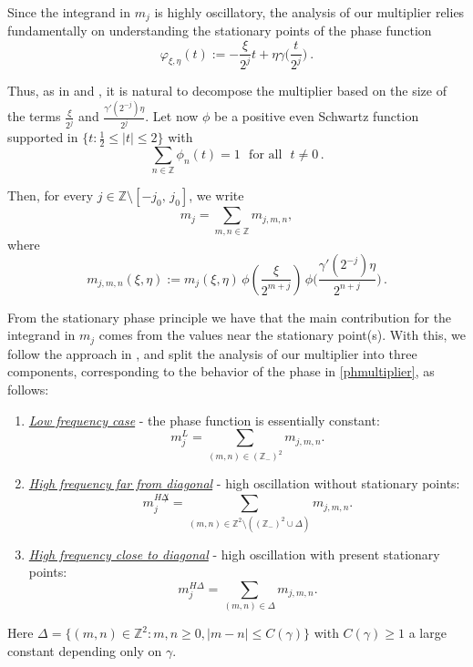 \documentclass{amsart}
\newcommand{\Z}{\mathbb{Z}}
\theoremstyle{definition}
\theoremstyle{remark}
\numberwithin{equation}{section}
\begin{document}
Since the integrand in $m_{j}$ is highly oscillatory, the analysis of our multiplier relies fundamentally
on understanding the stationary points of the phase function
\begin{equation}\label{phmultiplier}
 \varphi_{\xi,\eta}(t):=-\frac{\xi}{2^{j}}t+\eta\gamma\big(\frac{t}{2^{j}}\big)\:.
\end{equation}

Thus, as in \cite{lie2015boundedness} and \cite{lie2019unifiedap}, it is natural to decompose the multiplier based on the size of the terms $\frac{\xi}{2^{j}}$ and $\frac{\gamma'(2^{-j})\eta}{2^{j}}$.
Let now $\phi$ be a positive even Schwartz function supported in $\{t:\frac{1}{2}\le|t|\le 2\}$ with
$$\sum_{n\in\Z}\phi_n(t)=1\:\:\: \textrm{for all}\:\:\:t\not=0\,.$$

Then, for every $j\in\Z\setminus [-j_0,\,j_0]$, we write
\begin{equation}
m_j=\sum_{m,n\in\Z} m_{j,m,n},
\end{equation}
where
\begin{equation}\label{mjmn}
m_{j,m,n}(\xi,\eta):=m_j(\xi,\eta)\,\phi(\frac{\xi}{2^{m+j}})\,\phi\Big(\frac{\gamma'(2^{-j})\eta}{2^{n+j}}\Big)\,.
\end{equation}

From the stationary phase principle  we have that the main contribution for the integrand in $m_j$ comes from the values near the stationary point(s). With this, we follow the approach in \cite{lie2015boundedness}, and split the analysis of our multiplier into three components, corresponding to the behavior of the phase in \eqref{phmultiplier}, as follows:

\begin{enumerate}
 \item[I)] \underline{\emph{Low frequency case}} - the phase function is essentially constant:
\begin{equation}\label{low_freq}
m_j^L=\sum_{(m,n)\in(\Z_-)^2} m_{j,m,n}.
\end{equation}
\item[II)] \underline{\emph{High frequency far from diagonal}} - high oscillation without stationary points:
\begin{equation}\label{high_far}
  m_j^{H\not\Delta}=\sum_{(m,n)\in\Z^2\setminus((\Z_-)^2\cup\Delta)}m_{j,m,n}.
\end{equation}
\item[III)] \underline{\emph{High frequency close to diagonal}} - high oscillation with present stationary points:
\begin{equation}\label{high-close}
 m_j^{H\Delta}=\sum_{(m,n)\in\Delta}m_{j,m,n}.
\end{equation}
\end{enumerate}
Here $\Delta=\{(m,n)\in\Z^2:m,n\ge0,|m-n|\le C(\gamma)\}$ with $C(\gamma)\ge 1$ a large constant depending only on $\gamma$.
\end{document}

